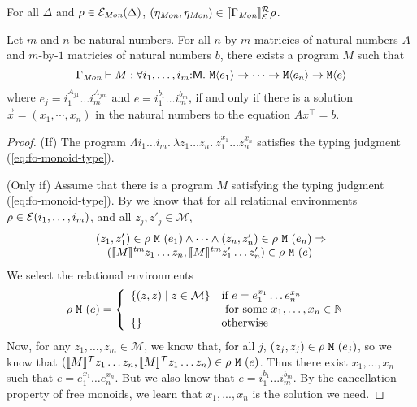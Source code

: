 \begin{lemma}
  For all $\Delta$ and $\rho \in \mathcal{E}_{\textit{Mon}}(\Delta)$,
  $(\eta_{\textit{Mon}},\eta_{\textit{Mon}}) \in \llbracket \Gamma_{\textit{Mon}} \rrbracket^{\mathcal{R}}_{\mathcal{E}}{\rho}$.
\end{lemma}

\begin{theorem}
  Let $m$ and $n$ be natural numbers. For all $n$-by-$m$-matricies of
  natural numbers $A$ and $m$-by-$1$ matricies of natural numbers $b$,
  there exists a program $M$ such that
  \begin{equation}
    \label{eq:fo-monoid-type}
    \Gamma_\Mon \vdash M : \forall i_1,\dots,i_m\mathord:\mathsf{M}.\ \tyPrim{M}{e_1} \to \dots \to \tyPrim{M}{e_n} \to \tyPrim{M}{e}
  \end{equation}
  where $e_j = i_1^{A_{j1}}\dots i_m^{A_{jm}}$ and $e =
  i_1^{b_1}\dots i_m^{b_m}$, if and only if there is a solution
  $\vec{x} = (x_1,\cdots,x_n)$ in the natural numbers to the equation
  $A x^\top = b$.
\end{theorem}

\begin{proof}
  (If) The program $\Lambda i_1\dots i_m.\ \lambda z_1\dots z_n.\
  z_1^{x_1}\dots z_n^{x_n}$ satisfies the typing judgment
  (\ref{eq:fo-monoid-type}).

  (Only if) Assume that there is a program $M$ satisfying the typing
  judgment (\ref{eq:fo-monoid-type}). By \thmref{thm:abstraction} we
  know that for all relational environments $\rho \in
  \mathcal{E}(i_1,\dots,i_m)$, and all $z_j,z'_j \in \mathcal{M}$,
  \begin{displaymath}
    \begin{array}{l}
      (z_1,z'_1) \in \rho\ \tyPrimNm{M}\ (e_1) \land \dots \land (z_n,z'_n) \in \rho\ \tyPrimNm{M}\ (e_n) \Rightarrow \\
      \quad (\tmSem{M}z_1\dots z_n, \tmSem{M}z'_1\dots z'_n) \in \rho\ \tyPrimNm{M}\ (e)
    \end{array}
  \end{displaymath}
  We select the relational environments
  \begin{displaymath}
    \rho\ \tyPrimNm{M}\ (e) = \left\{
      \begin{array}{ll}
        \{(z,z) \sepbar z \in \mathcal{M} \} &
        \begin{array}[t]{@{}l}
          \textrm{if}\ e = e_1^{x_1}\dots e_n^{x_n} \\
          \textrm{ for some }x_1,\dots,x_n \in \mathbb{N}
        \end{array}
        \\
        \{\} & \textrm{otherwise}
      \end{array}
    \right.
  \end{displaymath}
  Now, for any $z_1,\dots,z_m \in \mathcal{M}$, we know that, for all
  $j$, $(z_j,z_j) \in \rho\ \tyPrimNm{M}\ (e_j)$, so we know that
  $(\llbracket M \rrbracket^{\mathcal{T}}z_1\dots z_n, \llbracket M \rrbracket^{\mathcal{T}}z_1 \dots z_n) \in \rho\
  \texttt{M}\ (e)$. Thus there exist $x_1,...,x_n$ such that $e =
  e_1^{x_1}\dots e_n^{x_n}$. But we also know that $e =
  i_1^{b_1}...i_m^{b_m}$. By the cancellation property of free
  monoids, we learn that $x_1,...,x_n$ is the solution we need.
\end{proof}

